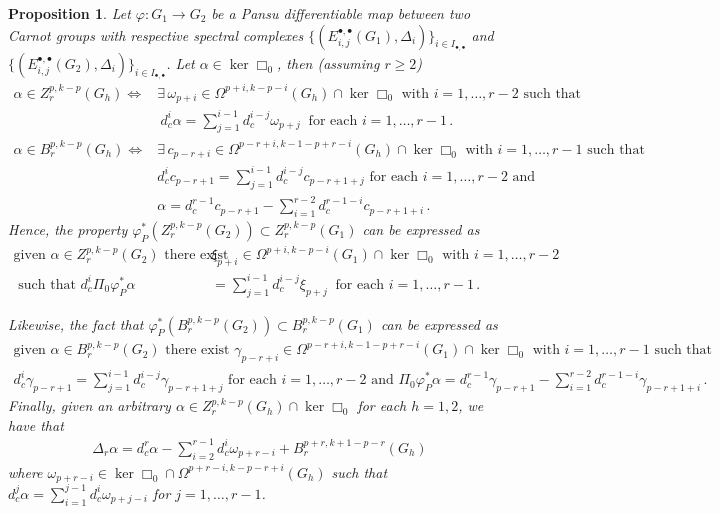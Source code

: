 \documentclass[dvipsnames]{amsart}
\newtheorem{proposition}[theorem]{Proposition}
\theoremstyle{definition}
\theoremstyle{definition}
\numberwithin{equation}{section}
\begin{document}
\begin{proposition}\label{prop: formulating main thm with Rumin differentials}
    Let $\varphi\colon G_1\to G_2$ be a Pansu differentiable map between two Carnot groups with respective spectral complexes $\{(E_{i,j}^{\bullet,\bullet}(G_1),\Delta_i)\}_{i\in I_{\bullet,\bullet}}$ and $\{(E_{i,j}^{\bullet,\bullet}(G_2),\Delta_i)\}_{i\in I_{\bullet,\bullet}}$. Let $\alpha \in \ker \Box_0$, then (assuming $r\ge 2$) 
   \begin{align*}
       \alpha\in Z_r^{p,k-p}(G_h)\Longleftrightarrow &\exists\,  \omega_{p+i}\in\Omega^{p+i,k-p-i}(G_h)\cap\ker\Box_0 \text{ with }i=1,\ldots,r-2\text{ such that }\\
       &\ d_c^i\alpha=\sum_{j=1}^{i-1}d_c^{i-j}\omega_{p+j}\ \text{ for each }i=1,\ldots,r-1\,.\\
       \alpha\in B_r^{p,k-p}(G_h)\Longleftrightarrow&\exists\, c_{p-r+i}\in\Omega^{p-r+i,k-1-p+r-i}(G_h)\cap\ker\Box_0\text{ with }i=1,\ldots,r-1\text{ such that }\\
       & d_c^ic_{p-r+1}=\sum_{j=1}^{i-1}d_c^{i-j}c_{p-r+1+j}\text{ for each }i=1,\ldots,r-2\text{ and }\\
       &\alpha=d_c^{r-1}c_{p-r+1}-\sum_{i=1}^{r-2}d_c^{r-1-i}c_{p-r+1+i}\,.
   \end{align*}
   Hence, the property $\varphi_P^\ast(Z_r^{p,k-p}(G_2))\subset Z_r^{p,k-p}(G_1)$ can be expressed as
   \begin{align*}
       \text{given }\alpha\in Z_r^{p,k-p}(G_2)\text{ there exist }&\xi_{p+i}\in\Omega^{p+i,k-p-i}(G_1)\cap\ker\Box_0\text{ with } i=1,\ldots,r-2\\ \text{ such that }
       d_c^i \Pi_0\varphi_P^\ast\alpha&=\sum_{j=1}^{i-1}d_c^{i-j}\xi_{p+j}\ \text{ for each }i=1,\ldots,r-1\,.
   \end{align*}

   Likewise, the fact that $\varphi_P^\ast(B_r^{p,k-p}(G_2))\subset B_r^{p,k-p}(G_1)$ can be expressed as
   \begin{align*}
       \text{given }\alpha\in B_r^{p,k-p}(G_2)\text{ there exist }\gamma_{p-r+i}\in\Omega^{p-r+i,k-1-p+r-i}(G_1)\cap\ker\Box_0\text{ with }i=1,\ldots,r-1
       \text{ such that }\\d_c^i\gamma_{p-r+1}=\sum_{j=1}^{i-1}d_c^{i-j}\gamma_{p-r+1+j}\text{ for each }i=1,\ldots,r-2\text{ and }\Pi_0\varphi_P^\ast\alpha=d_c^{r-1}\gamma_{p-r+1}-\sum_{i=1}^{r-2}d_c^{r-1-i}\gamma_{p-r+1+i}\,.
   \end{align*}
   Finally, given an arbitrary $\alpha\in Z_r^{p,k-p}(G_h) \cap \ker\Box_0$ for each $h=1,2$, we have that
   \begin{align*}
       \Delta_r\alpha=d_c^r\alpha-\sum_{i=2}^{r-1}d_c^i\omega_{p+r-i}+B_r^{p+r,k+1-p-r}(G_h)
   \end{align*}
   where $\omega_{p+r-i}\in\ker\Box_0\cap\Omega^{p+r-i,k-p-r+i}(G_h)$ such that $d_c^j\alpha=\sum_{i=1}^{j-1}d_c^i\omega_{p+j-i}$ for $j=1,\ldots,r-1$.
\end{proposition}
\end{document}
